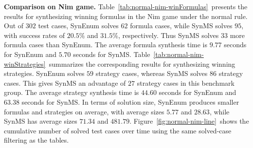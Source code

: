 \documentclass[review]{elsarticle}
\begin{document}
\textbf{Comparison on Nim game.}
Table~\ref{tab:normal-nim-winFormulas}~presents the results for synthesizing winning formulas in the Nim game under the normal rule.
Out of $302$ test cases, SynEnum solves $62$ formula cases, while SynMS solves $95$, with success rates of $20.5\%$ and $31.5\%$, respectively.
Thus SynMS solves $33$ more formula cases than SynEnum.
The average formula synthesis time is $9.77$ seconds for SynEnum and $5.70$ seconds for SynMS.
Table~\ref{tab:normal-nim-winStrategies}~summarizes the corresponding results for synthesizing winning strategies.
SynEnum solves $59$ strategy cases, whereas SynMS solves $86$ strategy cases.
This gives SynMS an advantage of $27$ strategy cases in this benchmark group.
The average strategy synthesis time is $44.60$ seconds for SynEnum and $63.38$ seconds for SynMS.
In terms of solution size, SynEnum produces smaller formulas and strategies on average, with average sizes $5.77$ and $28.63$, while SynMS has average sizes $71.34$ and $481.79$.
Figure~\ref{fig:normal-nim-line}~shows the cumulative number of solved test cases over time using the same solved-case filtering as the tables.
\end{document}
